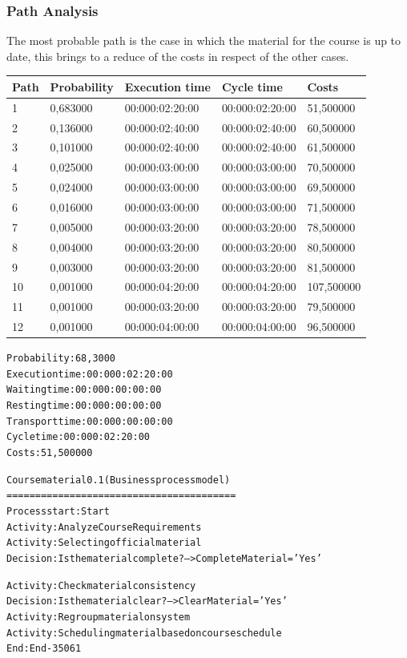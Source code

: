 \subsubsection{Path Analysis}
The most probable path is the case in which the material for the course is
up to date, this brings to a reduce of the costs in respect of the other
cases.

\begin{table}[ht!]
\centering
\begin{tabular}{|l|l|l|l|l|}
\hline
Path&Probability&Execution time&Cycle time&Costs\\
\hline
1&0,683000&00:000:02:20:00&00:000:02:20:00&51,500000\\
\hline
2&0,136000&00:000:02:40:00&00:000:02:40:00&60,500000\\
\hline
3&0,101000&00:000:02:40:00&00:000:02:40:00&61,500000\\
\hline
4&0,025000&00:000:03:00:00&00:000:03:00:00&70,500000\\
\hline
5&0,024000&00:000:03:00:00&00:000:03:00:00&69,500000\\
\hline
6&0,016000&00:000:03:00:00&00:000:03:00:00&71,500000\\
\hline
7&0,005000&00:000:03:20:00&00:000:03:20:00&78,500000\\
\hline
8&0,004000&00:000:03:20:00&00:000:03:20:00&80,500000\\
\hline
9&0,003000&00:000:03:20:00&00:000:03:20:00&81,500000\\
\hline
10&0,001000&00:000:04:20:00&00:000:04:20:00&107,500000\\
\hline
11&0,001000&00:000:03:20:00&00:000:03:20:00&79,500000\\
\hline
12&0,001000&00:000:04:00:00&00:000:04:00:00&96,500000\\
\hline
\end{tabular}
\end{table}

\begin{alltt}
Probability:   68,3000%
Execution time:  00:000:02:20:00
Waiting time:  00:000:00:00:00
Resting time:  00:000:00:00:00
Transport time:  00:000:00:00:00
Cycle time:  00:000:02:20:00
Costs:  51,500000

Course material 0.1 (Business process model)
========================================
Process start: Start
Activity: Analyze Course Requirements
Activity: Selecting official material
Decision: Is the material complete? --> CompleteMaterial='Yes'

Activity: Check material consistency
Decision: Is the material clear? --> ClearMaterial='Yes'
Activity: Regroup material on system
Activity: Scheduling material based on course schedule
End: End-35061
\end{alltt}

